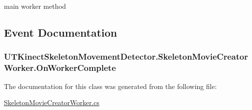 main worker method 



\subsection{Event Documentation}
\hypertarget{class_u_t_kinect_skeleton_movement_detector_1_1_skeleton_movie_creator_worker_a216a708362bfed5567535e47a6124dfb}{
\subsubsection[{On\-Worker\-Complete}]{ U\-T\-Kinect\-Skeleton\-Movement\-Detector.\-Skeleton\-Movie\-Creator\-Worker.\-On\-Worker\-Complete}}\label{class_u_t_kinect_skeleton_movement_detector_1_1_skeleton_movie_creator_worker_a216a708362bfed5567535e47a6124dfb}


The documentation for this class was generated from the following file\-:\begin{DoxyCompactItemize}
\item 
\hyperlink{_skeleton_movie_creator_worker_8cs}{Skeleton\-Movie\-Creator\-Worker.\-cs}\end{DoxyCompactItemize}
